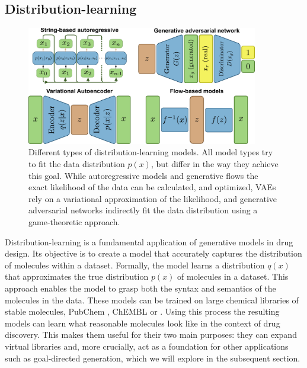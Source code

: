 \subsection{Distribution-learning}
\begin{figure}
      \centering
      \includegraphics[width=0.9\textwidth]{figures/distribution-learning-models.pdf}
      \caption{Different types of distribution-learning models. All model types
            try to fit the data distribution $p(x)$, but differ in the way they achieve this goal.
            While autoregressive models and generative flows the exact likelihood of the data can be calculated,
            and optimized, VAEs rely on a variational approximation of the likelihood, and generative adversarial networks
            indirectly fit the data distribution using a game-theoretic approach. \label{fig:distribution-learning-models}}
\end{figure}
Distribution-learning is a fundamental application of generative models in drug design. Its
objective is to create a model that accurately captures the distribution of molecules within a
dataset. Formally, the model learns a distribution $q(x)$ that approximates the true distribution
$p(x)$ of molecules in a dataset. This approach enables the model to grasp both the syntax and semantics of the
molecules in the data. These models can be trained on large chemical libraries of stable
molecules, PubChem \citep{kimPubChemSubstanceCompound2016}, ChEMBL \citep{bentoChEMBLBioactivityDatabase2014} or
\citep{zinc}. Using this process the resulting models can learn what reasonable molecules look like
in the context of drug discovery. This makes them useful for their two main purposes: they can
expand virtual libraries and, more crucially, act as a foundation for other applications such as
goal-directed generation, which we will explore in the subsequent section.

